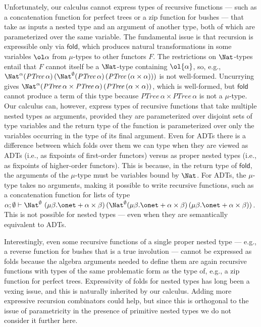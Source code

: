 \documentclass{lmcs}
\theoremstyle{plain}\newtheorem{satz}[thm]{Satz}
\newcommand{\fold}{\mathsf{fold}}
\begin{document}
Unfortunately, our calculus cannot express types of recursive
functions --- such as a concatenation function for perfect trees or a
zip function for bushes --- that take as inputs a nested type and an
argument of another type, both of which are parameterized over the
same variable. The fundamental issue is that recursion is expressible
only via $\fold$, which produces natural transformations in some
variables $\ol\alpha$ from $\mu$-types to other functors $F$. The
restrictions on $\Nat$-types entail that $F$ cannot itself be a
$\Nat$-type containing $\ol{\alpha}$, so, e.g., $\Nat^\alpha
(\mathit{PTree}\,\alpha) \,(\Nat^\emptyset (\mathit{PTree}\,\alpha)\,
(\mathit{PTree}\,(\alpha \times \alpha)))$ is not well-formed.
Uncurrying gives $\Nat^\alpha (\mathit{PTree}\,\alpha \times
\mathit{PTree}\,\alpha)\, (\mathit{PTree}\,(\alpha \times \alpha))$,
which is well-formed, but $\mathsf{fold}$ cannot produce a term of this
type because $\mathit{PTree}\,\alpha \times \mathit{PTree}\,\alpha$ is
not a $\mu$-type. Our calculus can, however, express types of
recursive functions that take multiple nested types as arguments,
provided they are parameterized over disjoint sets of type variables
and the return type of the function is parameterized over only the
variables occurring in the type of its final argument. Even for ADTs
there is a difference between which folds over them we can type when
they are viewed as ADTs (i.e., as fixpoints of first-order functors)
versus as proper nested types (i.e., as fixpoints of higher-order
functors). This is because, in the return type of $\mathsf{fold}$, the
arguments of the $\mu$-type must be variables bound by $\Nat$.  For
ADTs, the $\mu$-type takes no arguments, making it possible to write
recursive functions, such as a concatenation function for lists of
type $\alpha ; \emptyset \vdash \Nat^\emptyset \ (\mu \beta. \onet +
\alpha \times \beta)\, (\Nat^\emptyset (\mu \beta. \onet + \alpha
\times \beta) \, (\mu \beta. \onet + \alpha \times \beta))$.  This is
not possible for nested types --- even when they are semantically
equivalent to ADTs.

Interestingly, even some recursive functions of a single proper nested
type --- e.g., a reverse function for bushes that is a true involution
--- cannot be expressed as folds because the algebra arguments needed
to define them are again recursive functions with types of the same
problematic form as the type of, e.g., a zip function for perfect
trees.  Expressivity of folds for nested types has long been a vexing
issue, and this is naturally inherited by our calculus. Adding more
expressive recursion combinators could help, but since this is
orthogonal to the issue of parametricity in the presence of primitive
nested types we do not consider it further here.
\end{document}
